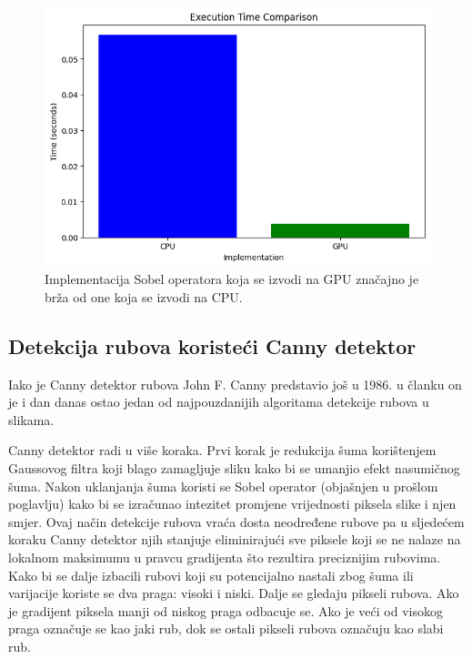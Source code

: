 \documentclass[a4paper,twocolumn]{article}
\begin{document}
        \begin{figure}[H]
        	\centering
        	\includegraphics[width=0.9\linewidth]{slike/sobel_comparison.png} 
        	\caption{Implementacija Sobel operatora koja se izvodi na GPU značajno je brža od one koja se izvodi na CPU.}
        	\label{fig:sobel_comparison}
        \end{figure} 
        
        
        
	\subsection{Detekcija rubova koristeći Canny detektor}
	
	Iako je Canny detektor rubova John F. Canny predstavio još u 1986. u članku \cite{Canny} on je i dan danas ostao jedan od najpouzdanijih algoritama detekcije rubova u slikama. 
	
	Canny detektor radi u više koraka. Prvi korak je redukcija šuma korištenjem Gaussovog filtra koji blago zamagljuje sliku kako bi se umanjio efekt nasumičnog šuma. Nakon uklanjanja šuma koristi se Sobel operator (objašnjen u prošlom poglavlju) kako bi se izračunao intezitet promjene vrijednosti piksela slike i njen smjer. Ovaj način detekcije rubova vraća dosta neodređene rubove pa u sljedećem koraku Canny detektor njih stanjuje eliminirajući sve piksele koji se ne nalaze na lokalnom maksimumu u pravcu gradijenta što rezultira preciznijim rubovima. Kako bi se dalje izbacili rubovi koji su potencijalno nastali zbog šuma ili varijacije koriste se dva praga: visoki i niski. Dalje se gledaju pikseli rubova. Ako je gradijent piksela manji od niskog praga odbacuje se. Ako je veći od visokog praga označuje se kao jaki rub, dok se ostali pikseli rubova označuju kao slabi rub.
	
\end{document}
